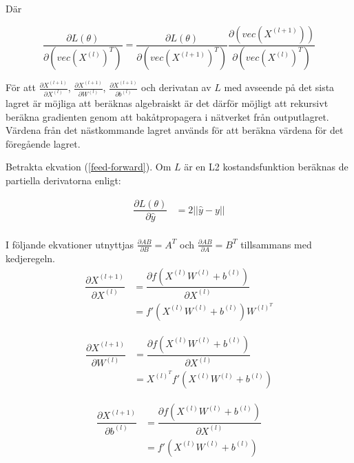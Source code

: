 \documentclass[a4paper,11pt,twoside]{article}
\newcommand*{\pd}[2]{\ensuremath{\dfrac{\partial #1}{\partial #2}}}
\newcommand*{\inpd}[2]{\ensuremath{\frac{\partial #1}{\partial #2}}}
\begin{document}
Där

\begin{equation}
\pd{L(\theta)}{(vec(X^{(l)})^T)} = \pd{L(\theta)}{(vec(X^{(l+1)})^T)} \pd{(vec(X^{(l+1)}))}{(vec(X^{(l)})^T)}
\end{equation}

För att $\inpd{X^{(l+1)}}{X^{(l)}}$, $\inpd{X^{(l+1)}}{W^{(l)}}$, $\inpd{X^{(l+1)}}{b^{(l)}}$ och derivatan av $L$ med avseende på det sista lagret är möjliga att beräknas algebraiskt är det därför möjligt att rekursivt beräkna gradienten genom att bakåtpropagera i nätverket från outputlagret. Värdena från det nästkommande lagret används för att beräkna värdena för det föregående lagret. \cite{convmath}

Betrakta ekvation (\ref{feed-forward}). Om $L$ är en L2 kostandsfunktion beräknas de partiella derivatorna enligt:  \cite{cs231n} \cite{convmath} 

\begin{equation}
\begin{split}
\pd{L(\theta)}{\hat{y}} 
				& = 2 ||\hat{y}-y|| \\
\end{split}
\end{equation}

I följande ekvationer utnyttjas $\inpd{AB}{B} = A^T$ och $\inpd{AB}{A} = B^T$ tillsammans med kedjeregeln.
\begin{equation}
\begin{split}
\pd{X^{(l+1)}}{X^{(l)}} 
				& = \pd{f(X^{(l)}W^{(l)} +b^{(l)})}{X^{(l)}}  \\
				& = f'(X^{(l)}W^{(l)}+b^{(l)})W^{(l)^T}
\end{split}
\end{equation}

\begin{equation}
\begin{split}
\pd{X^{(l+1)}}{W^{(l)}} 
				& = \pd{f(X^{(l)}W^{(l)} +b^{(l)})}{X^{(l)}}  \\
				& = X^{(l)^T}f'(X^{(l)}W^{(l)}+b^{(l)})
\end{split}
\end{equation}

\begin{equation}
\begin{split}
\pd{X^{(l+1)}}{b^{(l)}} 
				& = \pd{f(X^{(l)}W^{(l)} +b^{(l)})}{X^{(l)}}  \\
				& = f'(X^{(l)}W^{(l)}+b^{(l)})
\end{split}
\end{equation}
\end{document}
